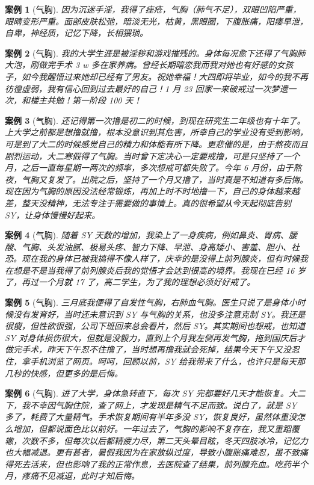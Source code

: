 \documentclass{ctexart}
\newtheorem{case}{案例}
\begin{document}
\begin{case}[气胸]
    因为沉迷手淫，我得了痤疮，气胸（肺气不足），双眼凹陷严重，眼睛变形严重。面部皮肤松弛，暗淡无光，枯黄，黑眼圈，下腹胀痛，阳痿早泄，自卑，神经质，记忆下降，长相猥琐。
\end{case}

\begin{case}[气胸]
    我的大学生涯是被淫秽和游戏摧残的。身体每况愈下还得了气胸肺大泡，刚做完手术 3 w 多在家养病。曾经长期暗恋我而我对她也有好感的女孩子，如今我醒悟过来她却已经有了男友。祝她幸福！大四即将毕业，如今的我不再彷徨虚弱，我有信心回到过去最好的自己！1 月 23 回家一来破戒过一次梦遗一次，和楼主共勉！第一阶段 100 天！
\end{case}

\begin{case}[气胸]
    还记得第一次撸是初二的时候，到现在研究生二年级也有十年了。上大学之前都是想撸就撸，根本没意识到其危害，所幸自己的学业没有受到影响，可是到了大二的时候感觉自己的精力和体能有所下降。更悲催的是，由于熬夜而且剧烈运动，大二寒假得了气胸。当时曾下定决心一定要戒撸，可是只坚持了一个月，之后一直每星期一两次的频率，多次想戒可都失败了。今年 6 月份，由于熬夜，气胸又复发了。出院之后，坚持了一个月又撸了，当时真是不知道有多后悔。现在因为气胸的原因没法经常锻炼，再加上时不时地撸一下，自己的身体越来越差，整天没精神，无法专注于需要做的事情上。真的很希望从今天起彻底告别 SY，让身体慢慢好起来。
\end{case}

\begin{case}[气胸]
    随着 SY 天数的增加，我染上了一身疾病，例如鼻炎、胃病、腰酸、气胸、头发油腻、极易头疼、智力下降、早泄、身高矮小、害羞、胆小、社恐。现在我的身体已被我搞得不像人样了，庆幸的是没得上前列腺炎，但有时候我在想是不是当我得了前列腺炎后我的觉悟才会达到很高的境界。我现在已经 16 岁了，再过一个月就 17 了，高二学生，为了我的理想必须好好戒了。
\end{case}

\begin{case}[气胸]
    三月底我便得了自发性气胸，右肺血气胸。医生只说了是身体小时候没有发育好，当时还未意识到 SY 与气胸的关系，也没多注意克制 SY。我还是很瘦，但性欲很强，公司下班回来总会看片，然后 SY。其实期间也想戒，也知道 SY 对身体损伤很大，但就是没毅力，直到上个月我左侧再发气胸，拖到国庆后才做完手术，昨天下午忍不住撸了，当时想再撸我就会死掉，结果今天下午又没忍住，拿手机浏览了网页。呵呵，回顾以前，SY 给我带来了什么，也许只是每天那几秒的快感，但更多的是后悔。
\end{case}

\begin{case}[气胸]
    进了大学，身体急转直下，每次 SY 完都要好几天才能恢复。大二下，我不幸因气胸住院，查了网上，才发现是精气不足而致。说白了，就是 SY 多了，耗费了大量精气。手术恢复期间有半年多没 SY，恢复良好，虽然体重没怎么增加，但都说面色比以前好。一年过去了，气胸的影响不复存在，我又重蹈覆辙，次数不多，但每次以后都精疲力尽，第二天头晕目眩，冬天四肢冰冷，记忆力也大幅减退。更有甚者，暑假我因为在家放纵过度，导致小腹胀痛难忍，虽不致痛得死去活来，但也影响了我的正常作息，去医院查了结果，前列腺充血。吃药半个月，疼痛不见减退，此时才知后悔。
\end{case}
\end{document}
